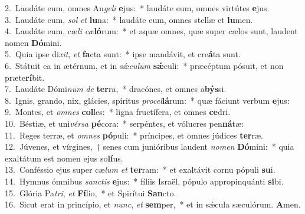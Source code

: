 {2.~}Laudáte eum, omnes An\textit{ge}\textit{li} \textbf{e}jus:~* laudáte eum, omnes virtútes \textbf{e}jus.\\
{3.~}Laudáte eum, \textit{sol} \textit{et} \textbf{lu}na:~* laudáte eum, omnes stellæ et \textbf{lu}men.\\
{4.~}Laudáte eum, cæ\textit{li} \textit{cæ}\textbf{ló}rum:~* et aquæ omnes, quæ super cælos sunt, laudent nomen \textbf{Dó}mini.\\
{5.~}Quia ipse di\textit{xit}, \textit{et} \textbf{fa}cta sunt:~* ipse mandávit, et cre\textbf{á}ta sunt.\\
{6.~}Státuit ea in ætérnum, et in sǽ\textit{cu}\textit{lum} \textbf{sǽ}culi:~* præcéptum pósuit, et non præte\textbf{rí}bit.\\
{7.~}Laudáte Dómi\textit{num} \textit{de} \textbf{ter}ra,~* dracónes, et omnes a\textbf{býs}si.\\
{8.~}Ignis, grando, nix, glácies, spíritus \textit{pro}\textit{cel}\textbf{lá}rum:~* quæ fáciunt verbum \textbf{e}jus:\\
{9.~}Montes, et \textit{om}\textit{nes} \textbf{col}les:~* ligna fructífera, et omnes \textbf{ce}dri.\\
{10.~}Béstiæ, et uni\textit{vér}\textit{sa} \textbf{pé}cora:~* serpéntes, et vólucres pen\textbf{ná}tæ:\\
{11.~}Reges terræ, et \textit{om}\textit{nes} \textbf{pó}puli:~* príncipes, et omnes júdices \textbf{ter}ræ.\\
{12.~}Júvenes, et vírgines,~† senes cum junióribus laudent \textit{no}\textit{men} \textbf{Dó}mini:~* quia exaltátum est nomen ejus so\textbf{lí}us.\\
{13.~}Conféssio ejus super cæ\textit{lum} \textit{et} \textbf{ter}ram:~* et exaltávit cornu pópuli \textbf{su}i.\\
{14.~}Hymnus ómnibus \textit{san}\textit{ctis} \textbf{e}jus:~* fíliis Israël, pópulo appropinquánti \textbf{si}bi.\\
{15.~}Glória Pa\textit{tri}, \textit{et} \textbf{Fí}lio,~* et Spirítui \textbf{San}cto.\\
{16.~}Sicut erat in princípio, et \textit{nunc}, \textit{et} \textbf{sem}per,~* et in sǽcula sæculórum. \textbf{A}men.\\
